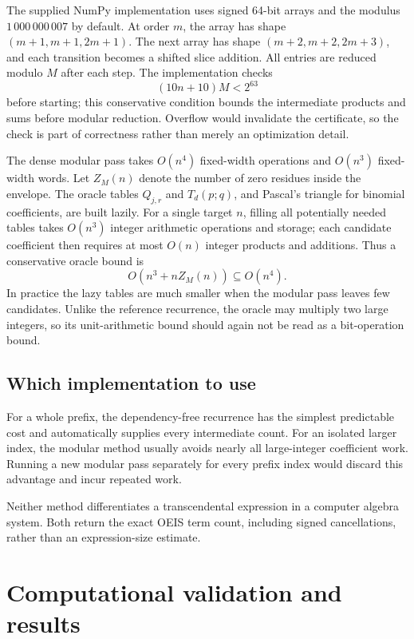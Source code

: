 \documentclass[11pt]{article}
\numberwithin{equation}{section}
\theoremstyle{definition}
\theoremstyle{remark}
\begin{document}
The supplied NumPy implementation uses signed 64-bit arrays and the modulus
$1\,000\,000\,007$ by default. At order $m$, the array has shape
$(m+1,m+1,2m+1)$. The next array has shape
$(m+2,m+2,2m+3)$, and each transition becomes a shifted slice addition.
All entries are reduced modulo $M$ after each step. The implementation checks
\[
 (10n+10)M<2^{63}
\]
before starting; this conservative condition bounds the intermediate
products and sums before modular reduction. Overflow would invalidate the
certificate, so the check is part of correctness rather than merely an
optimization detail.

The dense modular pass takes $O(n^4)$ fixed-width operations and $O(n^3)$
fixed-width words. Let $Z_M(n)$ denote the number of zero residues inside
the envelope. The oracle tables $Q_{j,r}$ and $T_d(p;q)$, and Pascal's
triangle for binomial coefficients, are built lazily. For a single target
$n$, filling all potentially needed tables takes $O(n^3)$ integer arithmetic
operations and storage; each candidate coefficient then requires at most
$O(n)$ integer products and additions. Thus a conservative oracle bound is
\[
 O(n^3+nZ_M(n))\subseteq O(n^4).
\]
In practice the lazy tables are much smaller when the modular pass leaves
few candidates. Unlike the reference recurrence, the oracle may multiply
two large integers, so its unit-arithmetic bound should again not be read
as a bit-operation bound.

\subsection{Which implementation to use}

For a whole prefix, the dependency-free recurrence has the simplest predictable
cost and automatically supplies every intermediate count. For an isolated
larger index, the modular method usually avoids nearly all large-integer
coefficient work. Running a new modular pass separately for every prefix
index would discard this advantage and incur repeated work.

Neither method differentiates a transcendental expression in a computer
algebra system. Both return the exact OEIS term count, including signed
cancellations, rather than an expression-size estimate.

\section{Computational validation and results}
\end{document}
